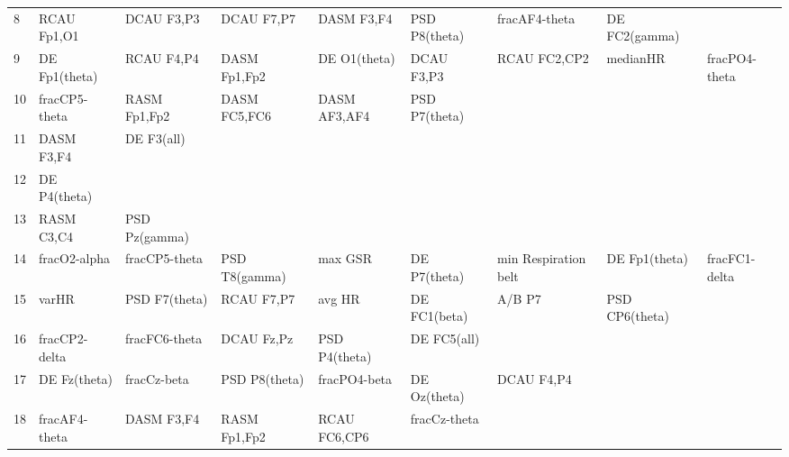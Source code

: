 \begin{landscape}
\begin{table}[]
\begin{tabular}{l|llllllll}
8                  & RCAU Fp1,O1          & DCAU F3,P3              & DCAU F7,P7           & DASM F3,F4         & PSD P8(theta)         & fracAF4-theta        & DE FC2(gamma)   &                 \\
9                  & DE Fp1(theta)        & RCAU F4,P4              & DASM Fp1,Fp2         & DE O1(theta)       & DCAU F3,P3            & RCAU FC2,CP2         & medianHR        & fracPO4-theta   \\
10                 & fracCP5-theta        & RASM Fp1,Fp2            & DASM FC5,FC6         & DASM AF3,AF4       & PSD P7(theta)         &                      &                 &                 \\
11                 & DASM F3,F4           & DE F3(all)              &                      &                    &                       &                      &                 &                 \\
12                 & DE P4(theta)         &                         &                      &                    &                       &                      &                 &                 \\
13                 & RASM C3,C4           & PSD Pz(gamma)           &                      &                    &                       &                      &                 &                 \\
14                 & fracO2-alpha         & fracCP5-theta           & PSD T8(gamma)        & max GSR            & DE P7(theta)          & min Respiration belt & DE Fp1(theta)   & fracFC1-delta   \\
15                 & varHR                & PSD F7(theta)           & RCAU F7,P7           & avg HR             & DE FC1(beta)          & A/B P7               & PSD CP6(theta)  &                 \\
16                 & fracCP2-delta        & fracFC6-theta           & DCAU Fz,Pz           & PSD P4(theta)      & DE FC5(all)           &                      &                 &                 \\
17                 & DE Fz(theta)         & fracCz-beta             & PSD P8(theta)        & fracPO4-beta       & DE Oz(theta)          & DCAU F4,P4           &                 &                 \\
18                 & fracAF4-theta        & DASM F3,F4              & RASM Fp1,Fp2         & RCAU FC6,CP6       & fracCz-theta          &                      &                 &                 \\

\end{tabular}
\end{table}
\end{landscape}
